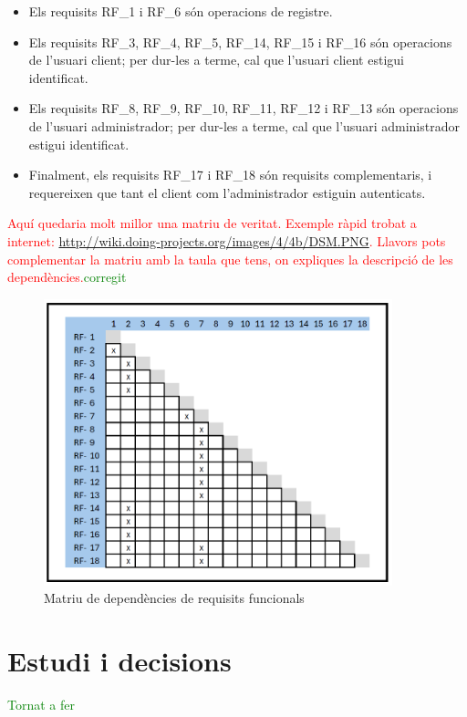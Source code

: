 \documentclass[a4paper,12pt,twoside]{ThesisStyle}
\newcommand{\pau}[1]{\textcolor{red}{#1}}
\newcommand{\sudan}[1]{\textcolor{green}{#1}}
\begin{document}
\begin{itemize}
    \item Els requisits RF\_1 i RF\_6 són operacions de registre.
    \item Els requisits RF\_3, RF\_4, RF\_5, RF\_14, RF\_15 i RF\_16 són operacions de l'usuari client; per dur-les a terme, cal que l'usuari client estigui identificat.
    \item Els requisits RF\_8, RF\_9, RF\_10, RF\_11, RF\_12 i RF\_13 són operacions de l'usuari administrador; per dur-les a terme, cal que l'usuari administrador estigui identificat.
    \item Finalment, els requisits RF\_17 i RF\_18 són requisits complementaris, i requereixen que tant el client com l'administrador estiguin autenticats.
\end{itemize}


\pau{Aquí quedaria molt millor una matriu de veritat. Exemple ràpid trobat a internet: \url{http://wiki.doing-projects.org/images/4/4b/DSM.PNG}. Llavors pots complementar la matriu amb la taula que tens, on expliques la descripció de les dependències.}\sudan{corregit}


\begin{figure}[h]
    \centering
    \includegraphics[width=0.9\textwidth]{imatges/taula dependencies.png}
    \caption{Matriu de dependències de requisits funcionals}
    \label{fig:Matriu de dependències de requisits funcionals}
\end{figure}



    

\chapter{Estudi i decisions}
\label{chp:estudi}
\sudan{Tornat a fer}
\end{document}

